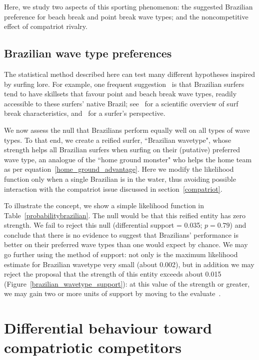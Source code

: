 \documentclass{article}
\begin{document}
Here, we study two aspects of this sporting phenomenon: the suggested
Brazilian preference for beach break and point break wave types; and the
noncompetitive effect of compatriot rivalry.

\subsection{Brazilian wave type preferences}

The statistical method described here can test many different
hypotheses inspired by surfing lore.  For example, one frequent
suggestion~\citep{burgess2020,ho2021} is that Brazilian surfers tend to
have skillsets that favour point and beach break wave types, readily
accessible to these surfers' native Brazil; see~\citet{scarfe2003} for
a scientific overview of surf break characteristics,
and~\citet{butt2004} for a surfer's perspective.

We now assess the null that Brazilians perform equally well on all
types of wave types.  To that end, we create a reified surfer,
``Brazilian wavetype", whose strength helps all Brazilian surfers
when surfing on their (putative) preferred wave type, an analogue of
the ``home ground monster" who helps the home team as per
equation~\ref{home_ground_advantage}.  Here we modify the likelihood
function only when a single Brazilian is in the water, thus avoiding
possible interaction with the compatriot issue discussed in
section~\ref{compatriot}.

To illustrate the concept, we show a simple likelihood function in
Table~\ref{probabilitybrazilian}.  The null would be that this reified
entity has zero strength.  We fail to reject this null (differential
support = 0.035; $p=0.79$) and conclude that there is no evidence to
suggest that Brazilians' performance is better on their preferred wave
types than one would expect by chance.  We may go further using the
method of support: not only is the maximum likelihood estimate for
Brazilian wavetype very small (about 0.002), but in addition we may
reject the proposal that the strength of this entity exceeds about
0.015 (Figure~\ref{brazilian_wavetype_support}): at this value of the
strength or greater, we may gain two or more units of support by
moving to the evaluate~\citep{edwards1992}.


\section{Differential \label{compatriot} behaviour toward compatriotic competitors}
\end{document}
